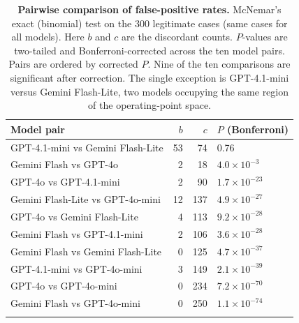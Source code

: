 \documentclass[pdflatex,sn-basic,Numbered]{sn-jnl}
\newcommand{\HLtag}[1]{{\color{HLink}\bfseries [#1]~}}
\renewcommand{\HLtag}[1]{}}}
\begin{document}
\begin{table}[t]
\caption{\HLtag{Revised in revision}\textbf{Pairwise comparison of false-positive rates.} McNemar's exact (binomial) test on the 300 legitimate cases (same cases for all models). Here $b$ and $c$ are the discordant counts. $P$-values are two-tailed and Bonferroni-corrected across the ten model pairs. Pairs are ordered by corrected $P$. Nine of the ten comparisons are significant after correction. The single exception is GPT-4.1-mini versus Gemini Flash-Lite, two models occupying the same region of the operating-point space.}\label{tab:mcnemar}
\begin{tabular}{@{}lrrl@{}}
\toprule
Model pair & $b$ & $c$ & $P$ (Bonferroni) \\
\midrule
GPT-4.1-mini vs Gemini Flash-Lite      & 53 & 74 & 0.76 \\
Gemini Flash vs GPT-4o                 & 2 & 18 & $4.0\times10^{-3}$ \\
GPT-4o vs GPT-4.1-mini                 & 2 & 90 & $1.7\times10^{-23}$ \\
Gemini Flash-Lite vs GPT-4o-mini       & 12 & 137 & $4.9\times10^{-27}$ \\
GPT-4o vs Gemini Flash-Lite            & 4 & 113 & $9.2\times10^{-28}$ \\
Gemini Flash vs GPT-4.1-mini           & 2 & 106 & $3.6\times10^{-28}$ \\
Gemini Flash vs Gemini Flash-Lite      & 0 & 125 & $4.7\times10^{-37}$ \\
GPT-4.1-mini vs GPT-4o-mini            & 3 & 149 & $2.1\times10^{-39}$ \\
GPT-4o vs GPT-4o-mini                  & 0 & 234 & $7.2\times10^{-70}$ \\
Gemini Flash vs GPT-4o-mini            & 0 & 250 & $1.1\times10^{-74}$ \\
\botrule
\end{tabular}
\end{table}
\end{document}

